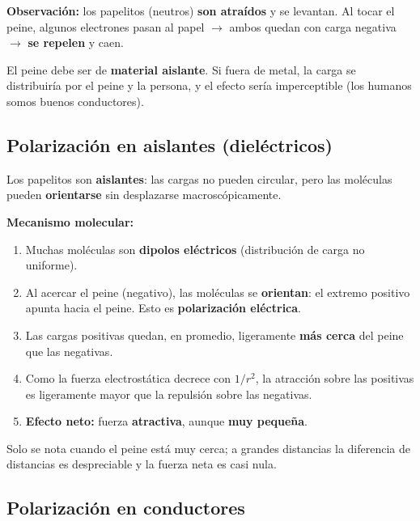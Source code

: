 \documentclass[12pt,a4paper]{article}
\begin{document}
\textbf{Observación:} los papelitos (neutros) \textbf{son atraídos} y se
levantan. Al tocar el peine, algunos electrones pasan al papel $\to$
ambos quedan con carga negativa $\to$ \textbf{se repelen} y caen.

\begin{warnbox}
  El peine debe ser de \textbf{material aislante}. Si fuera de metal,
  la carga se distribuiría por el peine y la persona, y el efecto sería
  imperceptible (los humanos somos buenos conductores).
\end{warnbox}

\subsection{Polarización en aislantes (dieléctricos)}

Los papelitos son \textbf{aislantes}: las cargas no pueden circular,
pero las moléculas pueden \textbf{orientarse} sin desplazarse
macroscópicamente.

\textbf{Mecanismo molecular:}
\begin{enumerate}[nosep]
  \item Muchas moléculas son \textbf{dipolos eléctricos} (distribución
        de carga no uniforme).
  \item Al acercar el peine (negativo), las moléculas se
        \textbf{orientan}: el extremo positivo apunta hacia el peine.
        Esto es \textbf{polarización eléctrica}.
  \item Las cargas positivas quedan, en promedio, ligeramente
        \textbf{más cerca} del peine que las negativas.
  \item Como la fuerza electrostática decrece con $1/r^{2}$, la
        atracción sobre las positivas es ligeramente mayor que la
        repulsión sobre las negativas.
  \item \textbf{Efecto neto:} fuerza \textbf{atractiva}, aunque
        \textbf{muy pequeña}.
\end{enumerate}

\begin{keybox}
  Solo se nota cuando el peine está muy cerca; a grandes distancias la
  diferencia de distancias es despreciable y la fuerza neta es casi
  nula.
\end{keybox}

\subsection{Polarización en conductores}
\end{document}
